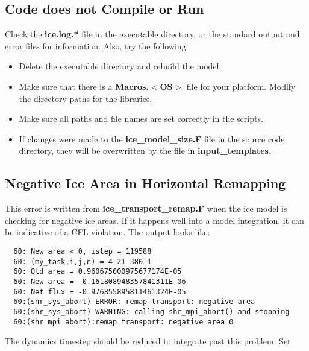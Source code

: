 
\subsection{Code does not Compile or Run }

Check the {\bf ice.log.*} file in the executable directory, or
the standard output and error files for information.  Also,
try the following:

\begin{itemize}
  \item Delete the executable directory and rebuild the model.
  \item Make sure that there is a {\bf Macros.$<$OS$>$} file for your
        platform.  Modify the directory paths for the libraries.
  \item Make sure all paths and file names are set correctly in the scripts.
  \item If changes were made to the {\bf ice\_model\_size.F} file in the
        source code directory, they will be overwritten by the file
        in {\bf input\_templates}.  
         
\end{itemize}

\subsection{Negative Ice Area in Horizontal Remapping}

This error is written from {\bf ice\_transport\_remap.F} when the ice model
is checking for negative ice areas. If it happens well into a model integration,
it can be indicative of a CFL violation.  The output looks like:

\begin{verbatim}
  60: New area < 0, istep = 119588
  60: (my_task,i,j,n) = 4 21 380 1
  60: Old area = 0.960675000975677174E-05
  60: New area = -0.161808948357841311E-06
  60: Net flux = -0.976855895811461324E-05
  60:(shr_sys_abort) ERROR: remap transport: negative area
  60:(shr_sys_abort) WARNING: calling shr_mpi_abort() and stopping
  60:(shr_mpi_abort):remap transport: negative area 0
\end{verbatim}

The dynamics timestep should be reduced to integrate past this problem.  Set

